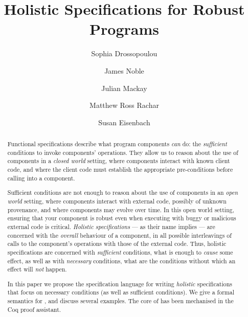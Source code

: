 \documentclass[acmsmall]{acmart}
\begin{document}

\title{Holistic Specifications for Robust Programs}

\author{Sophia Drossopoulou}

\author{James Noble}

\author{Julian Mackay}

\author{Matthew Ross Rachar}

\author{Susan Eisenbach}

\begin{abstract}
Functional specifications describe what
program components \emph{can} do: the \emph{sufficient} conditions to
invoke components' operations.
They allow us to reason about the  use  of  
components in  a \emph{closed world} setting, where
components interact with known client code, and 
where the client code must establish the appropriate pre-conditions 
before calling into a component.

Sufficient conditions are not enough to reason about 
the use of components in an \emph{open world} setting, where
components interact with external code, possibly of unknown
provenance, 
and where components may evolve over time. 
%
In this   open world  setting,
ensuring that your component is robust even when executing
 with buggy or malicious external code is critical.
 \emph{Holistic specifications}
--- as their name implies --- 
are concerned  with the \emph{overall} behaviour of a component,  in all possible 
interleavings of calls to the component's operations with those of the external code.
Thus, holistic specifications are concerned with \emph{sufficient} conditions, \ie
what is enough to \emph{cause} some effect, as well as with
\emph{necessary} conditions, \ie
what are the conditions without which an effect will \emph{not} happen. 
%

In this paper we
 propose the 
 \Chainmail specification language for writing \emph{holistic} specifications that
 focus on necessary conditions (as well as sufficient conditions). We
 give a formal semantics for \Chainmail, and discuss several examples.
 The core of \Chainmail has been
  mechanised in the Coq proof assistant.
\end{abstract}
\end{document}
